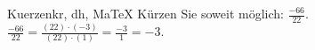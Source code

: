 \begin{MAufgabe}{Kuerzen}{kr, dh, MaTeX}
K\"urzen Sie soweit m\"oglich: $\frac{-66}{22}$.\\ 
\ifLsg\MLoesung
\quad $\frac{-66}{22}=\frac{(22)\cdot(-3)}{(22)\cdot(1)}=\frac{-3}{1}=-3$.\else\relax\fi
 \end{MAufgabe}